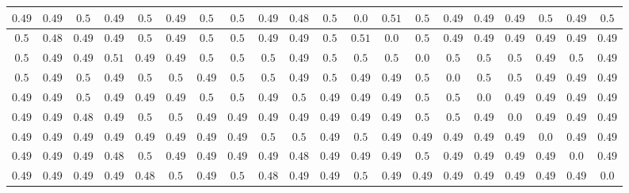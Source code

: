 \begin{table}[h!]
{\begin{tabular}{cccccccccccccccccccc}
$0.49$ & $0.49$ & $0.5$ & $0.49$ & $0.5$ & $0.49$ & $0.5$ & $0.5$ & $0.49$ & $0.48$ & $0.5$ & $0.0$ & $0.51$ & $0.5$ & $0.49$ & $0.49$ & $0.49$ & $0.5$ & $0.49$ & $0.5$\\ \hline
$0.5$ & $0.48$ & $0.49$ & $0.49$ & $0.5$ & $0.49$ & $0.5$ & $0.5$ & $0.49$ & $0.49$ & $0.5$ & $0.51$ & $0.0$ & $0.5$ & $0.49$ & $0.49$ & $0.49$ & $0.49$ & $0.49$ & $0.49$\\ \hline
$0.5$ & $0.49$ & $0.49$ & $0.51$ & $0.49$ & $0.49$ & $0.5$ & $0.5$ & $0.5$ & $0.49$ & $0.5$ & $0.5$ & $0.5$ & $0.0$ & $0.5$ & $0.5$ & $0.5$ & $0.49$ & $0.5$ & $0.49$\\ \hline
$0.5$ & $0.49$ & $0.5$ & $0.49$ & $0.5$ & $0.5$ & $0.49$ & $0.5$ & $0.5$ & $0.49$ & $0.5$ & $0.49$ & $0.49$ & $0.5$ & $0.0$ & $0.5$ & $0.5$ & $0.49$ & $0.49$ & $0.49$\\ \hline
$0.49$ & $0.49$ & $0.5$ & $0.49$ & $0.49$ & $0.49$ & $0.5$ & $0.5$ & $0.49$ & $0.5$ & $0.49$ & $0.49$ & $0.49$ & $0.5$ & $0.5$ & $0.0$ & $0.49$ & $0.49$ & $0.49$ & $0.49$\\ \hline
$0.49$ & $0.49$ & $0.48$ & $0.49$ & $0.5$ & $0.5$ & $0.49$ & $0.49$ & $0.49$ & $0.49$ & $0.49$ & $0.49$ & $0.49$ & $0.5$ & $0.5$ & $0.49$ & $0.0$ & $0.49$ & $0.49$ & $0.49$\\ \hline
$0.49$ & $0.49$ & $0.49$ & $0.49$ & $0.49$ & $0.49$ & $0.49$ & $0.49$ & $0.5$ & $0.5$ & $0.49$ & $0.5$ & $0.49$ & $0.49$ & $0.49$ & $0.49$ & $0.49$ & $0.0$ & $0.49$ & $0.49$\\ \hline
$0.49$ & $0.49$ & $0.49$ & $0.48$ & $0.5$ & $0.49$ & $0.49$ & $0.49$ & $0.49$ & $0.48$ & $0.49$ & $0.49$ & $0.49$ & $0.5$ & $0.49$ & $0.49$ & $0.49$ & $0.49$ & $0.0$ & $0.49$\\ \hline
$0.49$ & $0.49$ & $0.49$ & $0.49$ & $0.48$ & $0.5$ & $0.49$ & $0.5$ & $0.48$ & $0.49$ & $0.49$ & $0.5$ & $0.49$ & $0.49$ & $0.49$ & $0.49$ & $0.49$ & $0.49$ & $0.49$ & $0.0$
\end{tabular}}
\end{table}
